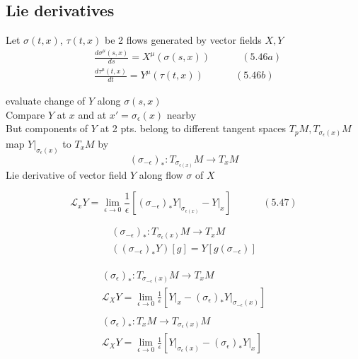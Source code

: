 \documentclass{book}
\newcommand{\exercisehead}[1]
  {\smallskip
   \noindent{\large\bf Exercise #1.}
   }
\begin{document}
\subsection{ Lie derivatives } 

Let $\sigma(t,x)$, $\tau(t,x)$ be 2 flows generated by vector fields $X,Y$ 
\[
\begin{aligned}
  & \frac{ d\sigma^{\mu}(s,x) }{ ds} = X^{\mu}(\sigma(s,x)) \quad \quad \quad \, (5.46a) \\ 
  & \frac{d\tau^{\mu}(t,x) }{ dt} = Y^{\mu}(\tau(t,x) ) \quad \quad \quad \, (5.46b)
\end{aligned}
\]

evaluate change of $Y$ along $\sigma(s,x)$  \\
Compare $Y$ at $x$ and at $x' = \sigma_{\epsilon}(x)$ nearby \\
But components of $Y$ at 2 pts. belong to different tangent spaces $T_pM, T_{\sigma_{\epsilon}(x) } M$ \\
map $\left. Y \right|_{\sigma_{\epsilon}(x) }$ to $T_xM$ by 
\[
( \sigma_{-\epsilon })_* : T_{\sigma_{ \epsilon(x)} } M \to T_x M
\]
Lie derivative of vector field $Y$ along flow $\sigma$ of $X$

\begin{equation}
  \mathcal{L}_x Y = \lim_{\epsilon \to 0 } \frac{1}{ \epsilon } \left[  ( \sigma_{-\epsilon })_* \left. Y \right|_{\sigma_{\epsilon(x)} } - \left. Y \right|_x \right] \quad \quad \quad \, (5.47)
\end{equation}


\[
\begin{gathered}
  (\sigma_{-\epsilon})_* : T_{\sigma_{ \epsilon }(x) } M \to T_x M \\ 
  ((\sigma_{-\epsilon})_* Y ) [g] = Y [ g(\sigma_{-\epsilon} ) ]
\end{gathered}
\]

\exercisehead{5.8 }

\[
\begin{gathered}
  \begin{gathered}
    (\sigma_{\epsilon})_* : T_{ \sigma_{-\epsilon }(x) } M \to T_x M \\
\mathcal{L}_X Y =     \lim_{ \epsilon \to 0 } \frac{1}{ \epsilon } \left[ \left. Y \right|_x -  \left. (\sigma_{\epsilon })_* Y \right|_{ \sigma_{ - \epsilon}(x) } \right]
\end{gathered} \\
    \begin{gathered}
    (\sigma_{\epsilon})_* : T_{ x } M \to T_{\sigma_{\epsilon}(x)} M \\
 \mathcal{L}_X Y =    \lim_{ \epsilon \to 0 } \frac{1}{ \epsilon } \left[ \left. Y \right|_{\sigma_{\epsilon}(x)} -  \left. (\sigma_{\epsilon })_* Y \right|_{ x } \right]
\end{gathered} 
\end{gathered}
\]
\end{document}
